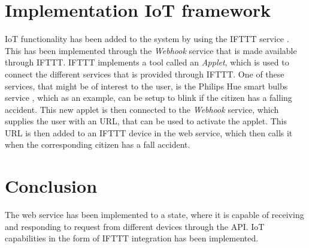 \section{Implementation IoT framework}\label{sec:iot}
IoT functionality has been added to the system by using the IFTTT service \cite{IFTTT}. This has been implemented through the \textit{Webhook} service that is made available through IFTTT. IFTTT implements a tool called an \textit{Applet}, which is used to connect the different services that is provided through IFTTT. One of these services, that might be of interest to the user, is the Philips Hue smart bulbs\cite{hue} service , which as an example, can be setup to blink if the citizen has a falling accident. This new applet is then connected to the \textit{Webhook} service, which supplies the user with an URL, that can be used to activate the applet. This URL is then added to an IFTTT device in the web service, which then calls it when the corresponding citizen has a fall accident.


\section{Conclusion}
The web service has been implemented to a state, where it is capable of receiving and responding to request from different devices through the API. IoT capabilities in the form of IFTTT integration has been implemented.